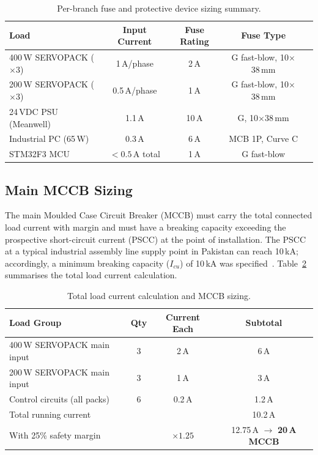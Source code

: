 \begin{table}[H]
    \centering
    \caption{Per-branch fuse and protective device sizing summary.}
    \label{tab:fuse_sizing}
    \renewcommand{\arraystretch}{1.2}
    \begin{tabular}{@{}lcccc@{}}
        \toprule
        \textbf{Load} & \textbf{Input Current} & \textbf{Fuse Rating} & \textbf{Fuse Type} \\
        \midrule
        400\,W SERVOPACK ($\times 3$) & 1\,A/phase & 2\,A & G fast-blow, 10$\times$38\,mm \\
        200\,W SERVOPACK ($\times 3$) & 0.5\,A/phase & 1\,A & G fast-blow, 10$\times$38\,mm \\
        24\,VDC PSU (Meanwell) & 1.1\,A & 10\,A & G, 10$\times$38\,mm \\
        Industrial PC (65\,W) & 0.3\,A & 6\,A & MCB 1P, Curve C \\
        STM32F3 MCU & $<0.5$\,A total & 1\,A & G fast-blow \\
        \bottomrule
    \end{tabular}
\end{table}

\subsection{Main MCCB Sizing}

The main Moulded Case Circuit Breaker (MCCB) must carry the total connected load current with margin and must have a breaking capacity exceeding the prospective short-circuit current (PSCC) at the point of installation. The PSCC at a typical industrial assembly line supply point in Pakistan can reach 10\,kA; accordingly, a minimum breaking capacity ($I_{cu}$) of 10\,kA was specified~\cite{iec60364}. Table~\ref{tab:mccb_sizing} summarises the total load current calculation.

\begin{table}[H]
    \centering
    \caption{Total load current calculation and MCCB sizing.}
    \label{tab:mccb_sizing}
    \renewcommand{\arraystretch}{1.2}
    \begin{tabular}{@{}lccc@{}}
        \toprule
        \textbf{Load Group} & \textbf{Qty} & \textbf{Current Each} & \textbf{Subtotal} \\
        \midrule
        400\,W SERVOPACK main input & 3 & 2\,A & 6\,A \\
        200\,W SERVOPACK main input & 3 & 1\,A & 3\,A \\
        Control circuits (all packs) & 6 & 0.2\,A & 1.2\,A \\
        \midrule
        Total running current & & & 10.2\,A \\
        With 25\% safety margin & & $\times 1.25$ & 12.75\,A $\rightarrow$ \textbf{20\,A MCCB} \\
        \bottomrule
    \end{tabular}
\end{table}

